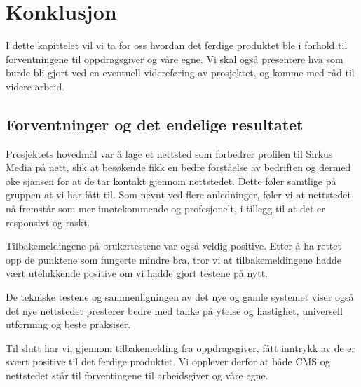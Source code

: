 \cleardoublepage
\chapter{Konklusjon}
\label{chap:conclusion} 

I dette kapittelet vil vi ta for oss hvordan det ferdige produktet ble i forhold til forventningene til oppdragsgiver og våre egne.  Vi skal også presentere hva som burde bli gjort ved en eventuell videreføring av prosjektet, og komme med råd til videre arbeid.

\section{Forventninger og det endelige resultatet}
Prosjektets hovedmål var å lage et nettsted som forbedrer profilen til Sirkus Media på nett, slik at besøkende fikk en bedre forståelse av bedriften og dermed øke sjansen for at de tar kontakt gjennom nettstedet. Dette føler samtlige på gruppen at vi har fått til. Som nevnt ved flere anledninger, føler vi at nettstedet nå fremstår som mer imøtekommende og profesjonelt, i tillegg til at det er responsivt og raskt.

Tilbakemeldingene på brukertestene var også veldig positive. Etter å ha rettet opp de punktene som fungerte mindre bra, tror vi at tilbakemeldingene hadde vært utelukkende positive om vi hadde gjort testene på nytt. 

De tekniske testene og sammenligningen av det nye og gamle systemet viser også det nye nettstedet presterer bedre med tanke på ytelse og hastighet, universell utforming og beste praksiser.

Til slutt har vi, gjennom tilbakemelding fra oppdragsgiver, fått inntrykk av de er svært positive til det ferdige produktet. Vi opplever derfor at både CMS og nettstedet står til forventingene til arbeidsgiver og våre egne.

